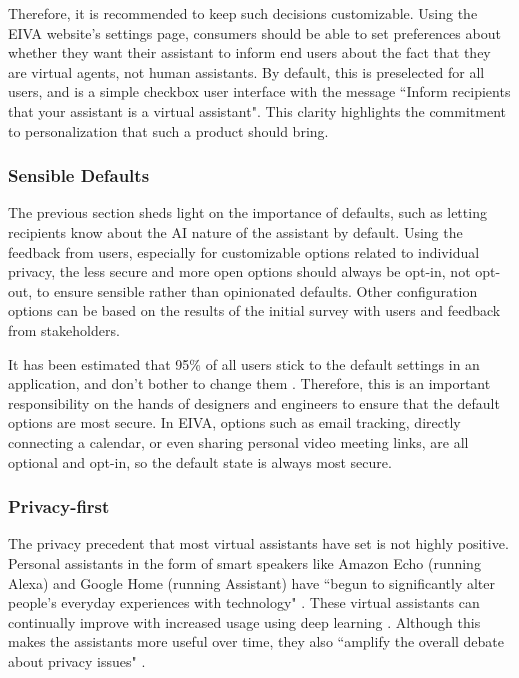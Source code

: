 \documentclass{article}
\begin{document}
Therefore, it is recommended to keep such decisions customizable. Using the EIVA website's settings page, consumers should be able to set preferences about whether they want their assistant to inform end users about the fact that they are virtual agents, not human assistants. By default, this is preselected for all users, and is a simple checkbox user interface with the message ``Inform recipients that your assistant is a virtual assistant". This clarity highlights the commitment to personalization that such a product should bring.

\subsubsection{Sensible Defaults}

The previous section sheds light on the importance of defaults, such as letting recipients know about the AI nature of the assistant by default. Using the feedback from users, especially for customizable options related to individual privacy, the less secure and more open options should always be opt-in, not opt-out, to ensure sensible rather than opinionated defaults. Other configuration options can be based on the results of the initial survey with users and feedback from stakeholders.

It has been estimated that 95\% of all users stick to the default settings in an application, and don't bother to change them \cite{catalanotto_95_2019}. Therefore, this is an important responsibility on the hands of designers and engineers to ensure that the default options are most secure. In EIVA, options such as email tracking, directly connecting a calendar, or even sharing personal video meeting links, are all optional and opt-in, so the default state is always most secure.

\subsubsection{Privacy-first}

The privacy precedent that most virtual assistants have set is not highly positive. Personal assistants in the form of smart speakers like Amazon Echo (running Alexa) and Google Home (running Assistant) have ``begun to significantly alter people’s everyday experiences with technology" \cite{pridmore_personal_2020}. These virtual assistants can continually improve with increased usage using deep learning \cite{kepuska_next-generation_2018}. Although this makes the assistants more useful over time, they also ``amplify the overall debate about privacy issues" \cite{zeng_end_2017}.
\end{document}
